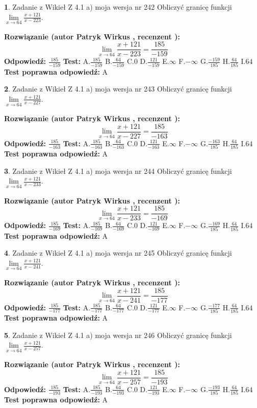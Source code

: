 \documentclass[12pt, a4paper]{article}
\theoremstyle{definition} %
\newtheorem{zad}{}
\newcommand{\zadStart}[1]{\begin{zad}#1\newline}
\newcommand{\zadStop}{\end{zad}}
\newcommand{\rozwStart}[2]{\noindent \textbf{Rozwiązanie (autor #1 , recenzent #2): }\newline}
\newcommand{\rozwStop}{\newline}
\newcommand{\odpStart}{\noindent \textbf{Odpowiedź:}\newline}
\newcommand{\odpStop}{\newline}
\newcommand{\testStart}{\noindent \textbf{Test:}\newline}
\newcommand{\testStop}{\newline}
\newcommand{\kluczStart}{\noindent \textbf{Test poprawna odpowiedź:}\newline}
\newcommand{\kluczStop}{\newline}
\begin{document}
\zadStart{Zadanie z Wikieł Z 4.1 a) moja wersja nr 242}
Obliczyć granicę funkcji $\lim\limits_{x\to64}\frac{x+121}{x-223}$.
\zadStop
\rozwStart{Patryk Wirkus}{}
$$\lim\limits_{x\to64}\frac{x+121}{x-223} = \frac{185}{-159}$$
\rozwStop
\odpStart
$\frac{185}{-159}$
\odpStop
\testStart
A.$\frac{185}{-159}$
B.$\frac{64}{-159}$
C.$0$
D.$\frac{121}{-159}$
E.$\infty$
F.$-\infty$
G.$\frac{-159}{185}$
H.$\frac{64}{185}$
I.$64$
\testStop
\kluczStart
A
\kluczStop



\zadStart{Zadanie z Wikieł Z 4.1 a) moja wersja nr 243}
Obliczyć granicę funkcji $\lim\limits_{x\to64}\frac{x+121}{x-227}$.
\zadStop
\rozwStart{Patryk Wirkus}{}
$$\lim\limits_{x\to64}\frac{x+121}{x-227} = \frac{185}{-163}$$
\rozwStop
\odpStart
$\frac{185}{-163}$
\odpStop
\testStart
A.$\frac{185}{-163}$
B.$\frac{64}{-163}$
C.$0$
D.$\frac{121}{-163}$
E.$\infty$
F.$-\infty$
G.$\frac{-163}{185}$
H.$\frac{64}{185}$
I.$64$
\testStop
\kluczStart
A
\kluczStop



\zadStart{Zadanie z Wikieł Z 4.1 a) moja wersja nr 244}
Obliczyć granicę funkcji $\lim\limits_{x\to64}\frac{x+121}{x-233}$.
\zadStop
\rozwStart{Patryk Wirkus}{}
$$\lim\limits_{x\to64}\frac{x+121}{x-233} = \frac{185}{-169}$$
\rozwStop
\odpStart
$\frac{185}{-169}$
\odpStop
\testStart
A.$\frac{185}{-169}$
B.$\frac{64}{-169}$
C.$0$
D.$\frac{121}{-169}$
E.$\infty$
F.$-\infty$
G.$\frac{-169}{185}$
H.$\frac{64}{185}$
I.$64$
\testStop
\kluczStart
A
\kluczStop



\zadStart{Zadanie z Wikieł Z 4.1 a) moja wersja nr 245}
Obliczyć granicę funkcji $\lim\limits_{x\to64}\frac{x+121}{x-241}$.
\zadStop
\rozwStart{Patryk Wirkus}{}
$$\lim\limits_{x\to64}\frac{x+121}{x-241} = \frac{185}{-177}$$
\rozwStop
\odpStart
$\frac{185}{-177}$
\odpStop
\testStart
A.$\frac{185}{-177}$
B.$\frac{64}{-177}$
C.$0$
D.$\frac{121}{-177}$
E.$\infty$
F.$-\infty$
G.$\frac{-177}{185}$
H.$\frac{64}{185}$
I.$64$
\testStop
\kluczStart
A
\kluczStop



\zadStart{Zadanie z Wikieł Z 4.1 a) moja wersja nr 246}
Obliczyć granicę funkcji $\lim\limits_{x\to64}\frac{x+121}{x-257}$.
\zadStop
\rozwStart{Patryk Wirkus}{}
$$\lim\limits_{x\to64}\frac{x+121}{x-257} = \frac{185}{-193}$$
\rozwStop
\odpStart
$\frac{185}{-193}$
\odpStop
\testStart
A.$\frac{185}{-193}$
B.$\frac{64}{-193}$
C.$0$
D.$\frac{121}{-193}$
E.$\infty$
F.$-\infty$
G.$\frac{-193}{185}$
H.$\frac{64}{185}$
I.$64$
\testStop
\kluczStart
A
\kluczStop
\end{document}
